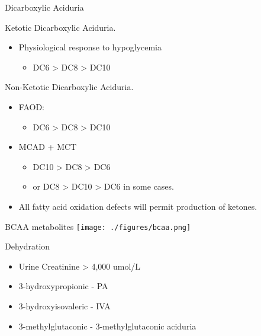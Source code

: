 \documentclass[presentation, smaller]{beamer}
\begin{document}
\begin{frame}[label={sec:orgheadline10}]{Dicarboxylic Aciduria}
\begin{block}{Ketotic Dicarboxylic Aciduria.}
\begin{itemize}
\item Physiological response to hypoglycemia
\begin{itemize}
\item DC6 > DC8 > DC10
\end{itemize}
\end{itemize}
\end{block}

\begin{block}{Non-Ketotic Dicarboxylic Aciduria.}
\begin{itemize}
\item FAOD:
\begin{itemize}
\item DC6 > DC8 > DC10
\end{itemize}
\item MCAD + MCT
\begin{itemize}
\item DC10 > DC8 > DC6
\item or DC8 > DC10 > DC6 in some cases.
\end{itemize}

\item All fatty acid oxidation defects will permit production of ketones.
\end{itemize}
\end{block}
\end{frame}

\begin{frame}[label={sec:orgheadline11}]{BCAA metabolites}
\centering
\texttt{[image: ./figures/bcaa.png]}
\end{frame}

\begin{frame}[label={sec:orgheadline12}]{Dehydration}
\begin{itemize}
\item Urine Creatinine > 4,000 umol/L

\item 3-hydroxypropionic - PA
\item 3-hydroxyisovaleric - IVA
\item 3-methylglutaconic - 3-methylglutaconic aciduria
\end{itemize}
\end{frame}
\end{document}
